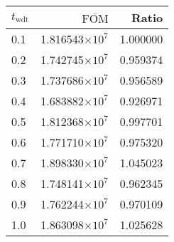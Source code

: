 \begin{tabular}{lrr}
\toprule
$t_{\mathrm{wdt}}$ & $\overline{\mathrm{FOM}}$ &    Ratio \\
\midrule
               0.1 &   1.816543$\times 10^{7}$ & 1.000000 \\
               0.2 &   1.742745$\times 10^{7}$ & 0.959374 \\
               0.3 &   1.737686$\times 10^{7}$ & 0.956589 \\
               0.4 &   1.683882$\times 10^{7}$ & 0.926971 \\
               0.5 &   1.812368$\times 10^{7}$ & 0.997701 \\
               0.6 &   1.771710$\times 10^{7}$ & 0.975320 \\
               0.7 &   1.898330$\times 10^{7}$ & 1.045023 \\
               0.8 &   1.748141$\times 10^{7}$ & 0.962345 \\
               0.9 &   1.762244$\times 10^{7}$ & 0.970109 \\
               1.0 &   1.863098$\times 10^{7}$ & 1.025628 \\
\bottomrule
\end{tabular}
